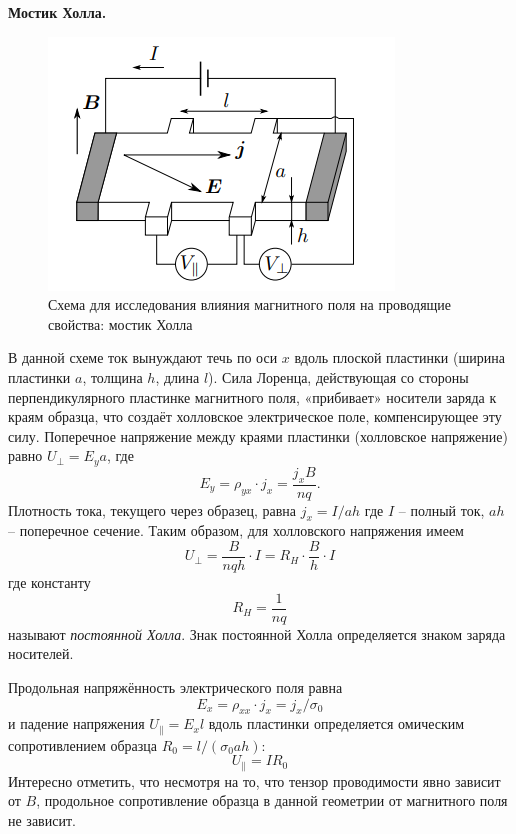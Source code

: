 \documentclass[a4paper,12pt]{article}
\begin{document}
\textbf{Мостик Холла.}
\begin{figure}[H]\label{fig: mostik Holla}
    \centering
    \includegraphics[scale = 0.95]{Мостик Холла.png}
    \caption{Схема для исследования влияния магнитного поля на проводящие свойства: мостик Холла}
\end{figure}
В данной схеме ток вынуждают течь по оси $x$ вдоль плоской пластинки  (ширина пластинки $a$, толщина $h$, длина $l$). Сила Лоренца, действующая со стороны перпендикулярного пластинке магнитного поля, «прибивает» носители заряда к краям образца, что создаёт холловское электрическое поле, компенсирующее эту силу. Поперечное напряжение между краями пластинки (холловское напряжение) равно $U_{\perp} = E_y a$, где
\[E_y = \rho_{yx} \cdot j_x = \frac{j_x B}{nq}.\]
Плотность тока, текущего через образец, равна $j_x = I / ah$ где $I$ -- полный ток, $ah$ -- поперечное сечение. Таким образом, для холловского напряжения имеем
\[U_{\perp} = \frac{B}{nqh} \cdot I = R_{H} \cdot \frac{B}{h} \cdot I\]
где константу
\[R_{H} = \frac{1}{nq}\]
называют \textit{постоянной Холла}. Знак постоянной Холла определяется знаком заряда носителей.

Продольная напряжённость электрического поля равна
\[E_x = \rho_{xx} \cdot j_x = j_x / \sigma_0\]
и падение напряжения $U_{\|} = E_x l$ вдоль пластинки определяется омическим сопротивлением образца $R_0 = l / (\sigma_0 a h)$:
\[U_{\|} = I R_0\]
Интересно отметить, что несмотря на то, что тензор проводимости явно зависит от $B$, продольное сопротивление образца в данной геометрии от магнитного поля не зависит.
\end{document}
